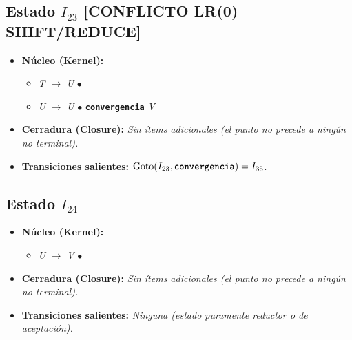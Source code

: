 \documentclass[12pt, letterpaper]{article}
\begin{document}
\subsection*{Estado $I_{23}$  \hfill {\color{accent}\textbf{[CONFLICTO LR(0) SHIFT/REDUCE]}}}
\begin{itemize}\setlength{\itemsep}{1pt}\setlength{\parskip}{0pt}
\item \textbf{Núcleo (Kernel):}
\begin{itemize}\setlength{\itemsep}{1pt}\setlength{\parskip}{0pt}
    \item \textit{T} $\to$ \textit{U} $\bullet$ 
    \item \textit{U} $\to$ \textit{U} $\bullet$ \textbf{\texttt{convergencia}} \textit{V}
\end{itemize}
\item \textbf{Cerradura (Closure):} \emph{Sin ítems adicionales (el punto no precede a ningún no terminal).}
\item \textbf{Transiciones salientes:} $\text{Goto}(I_{23}, \textbf{\texttt{convergencia}}) = I_{35}$.
\end{itemize}
\vspace{2pt}
\subsection*{Estado $I_{24}$ }
\begin{itemize}\setlength{\itemsep}{1pt}\setlength{\parskip}{0pt}
\item \textbf{Núcleo (Kernel):}
\begin{itemize}\setlength{\itemsep}{1pt}\setlength{\parskip}{0pt}
    \item \textit{U} $\to$ \textit{V} $\bullet$ 
\end{itemize}
\item \textbf{Cerradura (Closure):} \emph{Sin ítems adicionales (el punto no precede a ningún no terminal).}
\item \textbf{Transiciones salientes:} \emph{Ninguna (estado puramente reductor o de aceptación).}
\end{itemize}
\vspace{2pt}
\end{document}
